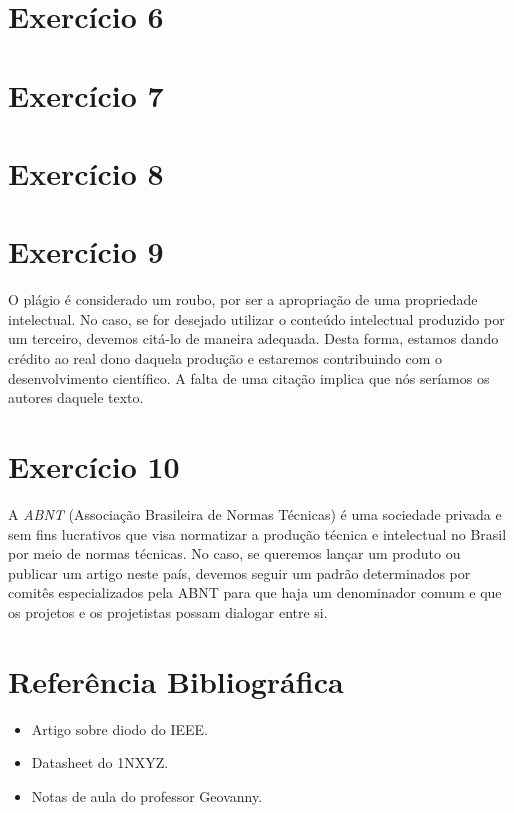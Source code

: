 \documentclass[12pt, a4paper, twoside]{article}
\begin{document}
\section{Exercício 6}

\section{Exercício 7}

\section{Exercício 8}

\section{Exercício 9}

O plágio é considerado um roubo, por ser a apropriação de uma propriedade intelectual.
No caso, se for desejado utilizar o conteúdo intelectual produzido por um terceiro,
devemos citá-lo de maneira adequada. Desta forma, estamos dando crédito ao real dono
daquela produção e estaremos contribuindo com o desenvolvimento científico. A falta de
uma citação implica que nós seríamos os autores daquele texto.

\section{Exercício 10}

A \textit{ABNT} (Associação Brasileira de Normas Técnicas) é uma sociedade privada e
sem fins lucrativos que visa normatizar a produção técnica e intelectual no Brasil por
meio de normas técnicas. No caso, se queremos lançar um produto ou publicar um artigo
neste país, devemos seguir um padrão determinados por comitês especializados pela ABNT
para que haja um denominador comum e que os projetos e os projetistas possam dialogar
entre si.

\section{Referência Bibliográfica}

\begin{itemize}
    \item Artigo sobre diodo do IEEE.
    \item Datasheet do 1NXYZ.
    \item Notas de aula do professor Geovanny.
\end{itemize}
\end{document}
